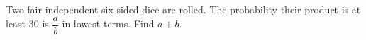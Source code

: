Two fair independent six-sided dice are rolled. The probability their product is at least 30 is $\dfrac{a}{b}$ in lowest terms. Find $a+b$.
